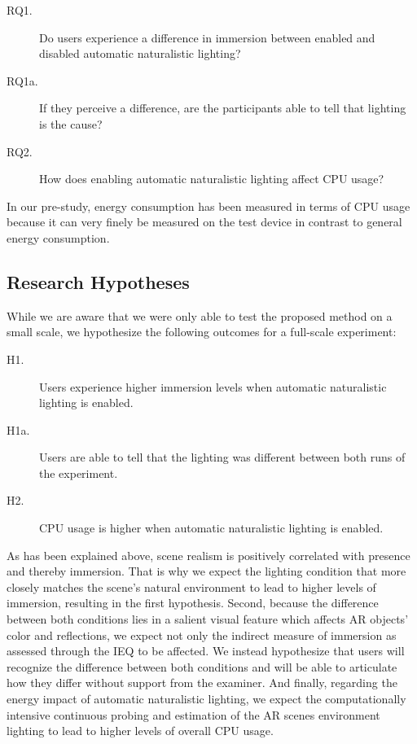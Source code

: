 \documentclass[12pt,twoside,english]{article}
\begin{document}
\begin{description}
    \item[RQ1.] Do users experience a difference in immersion between enabled and disabled automatic naturalistic lighting?
    \item[RQ1a.] If they perceive a difference, are the participants able to tell that lighting is the cause?
    \item[RQ2.] How does enabling automatic naturalistic lighting affect \gls{CPU} usage?
\end{description}

In our pre-study, energy consumption has been measured in terms of \gls{CPU} usage because it can very finely be measured on the test device in contrast to general energy consumption.

\subsection{Research Hypotheses}

While we are aware that we were only able to test the proposed method on a small scale, we hypothesize the following outcomes for a full-scale experiment:

\begin{description}
    \item[H1.] Users experience higher immersion levels when automatic naturalistic lighting is enabled.
    \item[H1a.] Users are able to tell that the lighting was different between both runs of the experiment.
    \item[H2.] \gls{CPU} usage is higher when automatic naturalistic lighting is enabled.
\end{description}

As has been explained above, scene realism is positively correlated with presence and thereby immersion.
That is why we expect the lighting condition that more closely matches the scene's natural environment to lead to higher levels of immersion, resulting in the first hypothesis.
Second, because the difference between both conditions lies in a salient visual feature which affects \gls{AR} objects' color and reflections, we expect not only the indirect measure of immersion as assessed through the \gls{IEQ} to be affected.
We instead hypothesize that users will recognize the difference between both conditions and will be able to articulate how they differ without support from the examiner.
And finally, regarding the energy impact of automatic naturalistic lighting, we expect the computationally intensive continuous probing and estimation of the \gls{AR} scenes environment lighting to lead to higher levels of overall \gls{CPU} usage.
\end{document}
